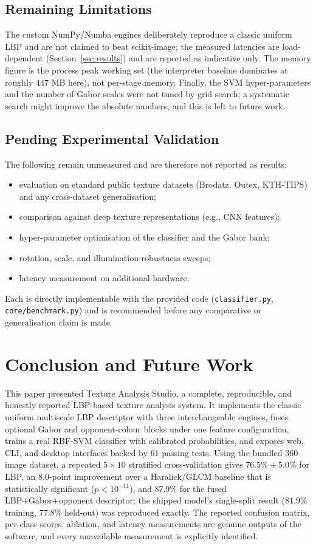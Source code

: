 \documentclass[conference]{IEEEtran}
\begin{document}
\subsection{Remaining Limitations}
The custom NumPy/Numba engines deliberately reproduce a classic uniform LBP
and are not claimed to beat scikit-image; the measured latencies are
load-dependent (Section~\ref{sec:results}) and are reported as indicative
only. The memory figure is the process peak working set (the interpreter
baseline dominates at roughly $447$ MB here), not per-stage memory. Finally,
the SVM hyper-parameters and the number of Gabor scales were not tuned by
grid search; a systematic search might improve the absolute numbers, and
this is left to future work.

\subsection{Pending Experimental Validation}
The following remain unmeasured and are therefore not reported as results:
\begin{itemize}
\item evaluation on standard public texture datasets (Brodatz, Outex,
KTH-TIPS) and any cross-dataset generalisation;
\item comparison against deep texture representations (e.g., CNN features);
\item hyper-parameter optimisation of the classifier and the Gabor bank;
\item rotation, scale, and illumination robustness sweeps;
\item latency measurement on additional hardware.
\end{itemize}
Each is directly implementable with the provided code
(\texttt{classifier.py}, \texttt{core/benchmark.py}) and is recommended
before any comparative or generalisation claim is made.

\section{Conclusion and Future Work}\label{sec:concl}
This paper presented Texture Analysis Studio, a complete, reproducible, and
honestly reported LBP-based texture analysis system. It implements the
classic uniform multiscale LBP descriptor with three interchangeable
engines, fuses optional Gabor and opponent-colour blocks under one feature
configuration, trains a real RBF-SVM classifier with calibrated
probabilities, and exposes web, CLI, and desktop interfaces backed by 61
passing tests. Using the bundled 360-image dataset, a repeated
$5\times10$ stratified cross-validation gives $76.5\%\pm5.0\%$ for LBP, an
$8.0$-point improvement over a Haralick/GLCM baseline that is statistically
significant ($p<10^{-11}$), and $87.9\%$ for the fused
LBP+Gabor+opponent descriptor; the shipped model's single-split result
($81.9\%$ training, $77.8\%$ held-out) was reproduced exactly. The reported
confusion matrix, per-class scores, ablation, and latency measurements are
genuine outputs of the software, and every unavailable measurement is
explicitly identified.
\end{document}
